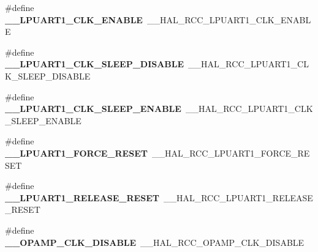 \begin{DoxyCompactItemize}
\item 
\#define {\bfseries \+\_\+\+\_\+\+L\+P\+U\+A\+R\+T1\+\_\+\+C\+L\+K\+\_\+\+E\+N\+A\+B\+LE}~\+\_\+\+\_\+\+H\+A\+L\+\_\+\+R\+C\+C\+\_\+\+L\+P\+U\+A\+R\+T1\+\_\+\+C\+L\+K\+\_\+\+E\+N\+A\+B\+LE\hypertarget{group___h_a_l___r_c_c___aliased_ga31a3336329cc12613dc4741af218dcca}{}\label{group___h_a_l___r_c_c___aliased_ga31a3336329cc12613dc4741af218dcca}

\item 
\#define {\bfseries \+\_\+\+\_\+\+L\+P\+U\+A\+R\+T1\+\_\+\+C\+L\+K\+\_\+\+S\+L\+E\+E\+P\+\_\+\+D\+I\+S\+A\+B\+LE}~\+\_\+\+\_\+\+H\+A\+L\+\_\+\+R\+C\+C\+\_\+\+L\+P\+U\+A\+R\+T1\+\_\+\+C\+L\+K\+\_\+\+S\+L\+E\+E\+P\+\_\+\+D\+I\+S\+A\+B\+LE\hypertarget{group___h_a_l___r_c_c___aliased_ga932fe128bb4feb05c8feec3783e08499}{}\label{group___h_a_l___r_c_c___aliased_ga932fe128bb4feb05c8feec3783e08499}

\item 
\#define {\bfseries \+\_\+\+\_\+\+L\+P\+U\+A\+R\+T1\+\_\+\+C\+L\+K\+\_\+\+S\+L\+E\+E\+P\+\_\+\+E\+N\+A\+B\+LE}~\+\_\+\+\_\+\+H\+A\+L\+\_\+\+R\+C\+C\+\_\+\+L\+P\+U\+A\+R\+T1\+\_\+\+C\+L\+K\+\_\+\+S\+L\+E\+E\+P\+\_\+\+E\+N\+A\+B\+LE\hypertarget{group___h_a_l___r_c_c___aliased_gac9485ddfd5a22a336990ed612758384e}{}\label{group___h_a_l___r_c_c___aliased_gac9485ddfd5a22a336990ed612758384e}

\item 
\#define {\bfseries \+\_\+\+\_\+\+L\+P\+U\+A\+R\+T1\+\_\+\+F\+O\+R\+C\+E\+\_\+\+R\+E\+S\+ET}~\+\_\+\+\_\+\+H\+A\+L\+\_\+\+R\+C\+C\+\_\+\+L\+P\+U\+A\+R\+T1\+\_\+\+F\+O\+R\+C\+E\+\_\+\+R\+E\+S\+ET\hypertarget{group___h_a_l___r_c_c___aliased_gaee163600587d77d2a199481ca6935c1b}{}\label{group___h_a_l___r_c_c___aliased_gaee163600587d77d2a199481ca6935c1b}

\item 
\#define {\bfseries \+\_\+\+\_\+\+L\+P\+U\+A\+R\+T1\+\_\+\+R\+E\+L\+E\+A\+S\+E\+\_\+\+R\+E\+S\+ET}~\+\_\+\+\_\+\+H\+A\+L\+\_\+\+R\+C\+C\+\_\+\+L\+P\+U\+A\+R\+T1\+\_\+\+R\+E\+L\+E\+A\+S\+E\+\_\+\+R\+E\+S\+ET\hypertarget{group___h_a_l___r_c_c___aliased_gaa785c5b0b6b59ec86a4a33307071d8b1}{}\label{group___h_a_l___r_c_c___aliased_gaa785c5b0b6b59ec86a4a33307071d8b1}

\item 
\#define {\bfseries \+\_\+\+\_\+\+O\+P\+A\+M\+P\+\_\+\+C\+L\+K\+\_\+\+D\+I\+S\+A\+B\+LE}~\+\_\+\+\_\+\+H\+A\+L\+\_\+\+R\+C\+C\+\_\+\+O\+P\+A\+M\+P\+\_\+\+C\+L\+K\+\_\+\+D\+I\+S\+A\+B\+LE\hypertarget{group___h_a_l___r_c_c___aliased_ga57437cfe118604cf72d55a9f85461322}{}\label{group___h_a_l___r_c_c___aliased_ga57437cfe118604cf72d55a9f85461322}


\end{DoxyCompactItemize}
